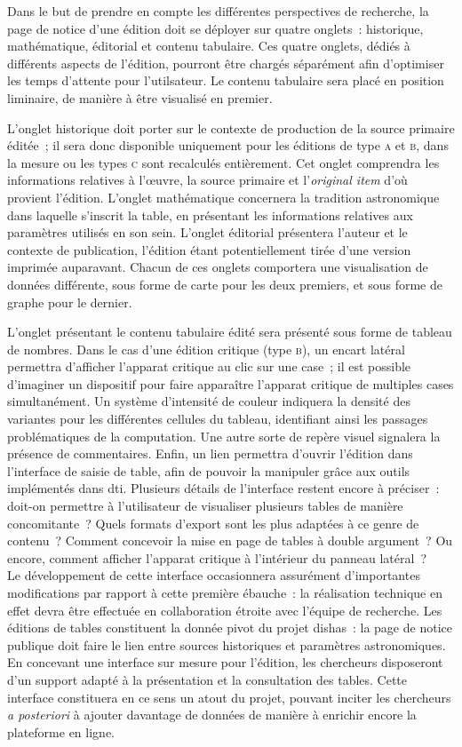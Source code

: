 \documentclass[a4paper,12pt,twoside]{book}
\newcommand{\eng}{\emph}
\newcommand{\oi}{\eng{original item}\xspace}
\newcommand{\dishas}{\gls{dishas}\xspace}
\newcommand{\dti}{\gls{dti}\xspace}
\begin{document}
Dans le but de prendre en compte les différentes perspectives de recherche, la page de notice d'une édition doit se déployer sur quatre onglets~: historique, mathématique, éditorial et contenu tabulaire. Ces quatre onglets, dédiés à différents aspects de l'édition, pourront être chargés séparément afin d'optimiser les temps d'attente pour l'utilsateur. Le contenu tabulaire sera placé en position liminaire, de manière à être visualisé en premier.

L'onglet historique doit porter sur le contexte de production de la source primaire éditée~; il sera donc disponible uniquement pour les éditions de type \textsc{a} et \textsc{b}, dans la mesure ou les types \textsc{c} sont recalculés entièrement. Cet onglet comprendra les informations relatives à l'œuvre, la source primaire et l'\oi d'où provient l'édition. L'onglet mathématique concernera la tradition astronomique dans laquelle s'inscrit la table, en présentant les informations relatives aux paramètres utilisés en son sein. L'onglet éditorial présentera l'auteur et le contexte de publication, l'édition étant potentiellement tirée d'une version imprimée auparavant. Chacun de ces onglets comportera une visualisation de données différente, sous forme de carte pour les deux premiers, et sous forme de graphe pour le dernier.

L'onglet présentant le contenu tabulaire édité sera présenté sous forme de tableau de nombres. Dans le cas d'une édition critique (type \textsc{b}), un encart latéral permettra d'afficher l'apparat critique au clic sur une case~; il est possible d'imaginer un dispositif pour faire apparaître l'apparat critique de multiples cases simultanément. Un système d'intensité de couleur indiquera la densité des variantes pour les différentes cellules du tableau, identifiant ainsi les passages problématiques de la computation. Une autre sorte de repère visuel signalera la présence de commentaires. Enfin, un lien permettra d'ouvrir l'édition dans l'interface de saisie de table, afin de pouvoir la manipuler grâce aux outils implémentés dans \dti. Plusieurs détails de l'interface restent encore à préciser~: doit-on permettre à l'utilisateur de visualiser plusieurs tables de manière concomitante~? Quels formats d'export sont les plus adaptées à ce genre de contenu~? Comment concevoir la mise en page de tables à double argument~? Ou encore, comment afficher l'apparat critique à l’intérieur du panneau latéral~?\\ 

Le développement de cette interface occasionnera assurément d'importantes modifications par rapport à cette première ébauche~: la réalisation technique en effet devra être effectuée en collaboration étroite avec l'équipe de recherche. Les éditions de tables constituent la donnée pivot du projet \dishas~: la page de notice publique doit faire le lien entre sources historiques et paramètres astronomiques. En concevant une interface sur mesure pour l'édition, les chercheurs disposeront d'un support adapté à la présentation et la consultation des tables. Cette interface constituera en ce sens un atout du projet, pouvant inciter les chercheurs \emph{a posteriori} à ajouter davantage de données de manière à enrichir encore la plateforme en ligne.
\end{document}

